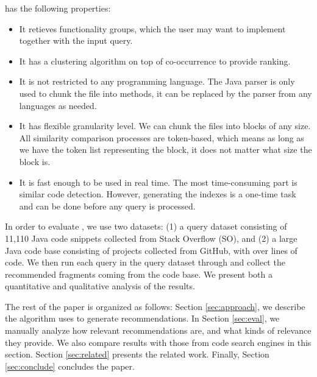 {\tool} has the following properties:
\begin{itemize}
	\item It retieves functionality groups, which the user may want to implement together with the input query.
	\item It has a clustering algorithm on top of co-occurrence to provide ranking.
	\item It is not restricted to any programming language. The Java parser is only used to chunk the file into methods, it can be replaced by the parser from any languages as needed.
	\item It has flexible granularity level. We can chunk the files into blocks of any size. All similarity comparison processes are token-based, which means as long as we have the token list representing the block, it does not matter what size the block is.
	\item It is fast enough to be used in real time. The most
          time-consuming part is similar code detection. However,
          generating the indexes is a one-time task and can be done
          before any query is processed.	
\end{itemize}

In order to evaluate {\tool}, we use two datasets: (1) a query dataset
consisting of 11,110 Java code snippets collected from Stack Overflow
(SO), and (2) a large Java code base consisting of  projects
collected from GitHub, with over  lines of code. We then run
each query in the query dataset through {\tool} and collect the
recommended fragments coming from the code base. We present both a
quantitative and qualitative analysis of the results.

The rest of the paper is organized as follows: Section
\ref{sec:approach}, we describe the algorithm {\tool} uses to generate
recommendations. In Section \ref{sec:eval}, we manually analyze how
relevant {\tool} recommendations are, and what kinds of relevance they
provide. We also compare {\tool} results with those from code search
engines in this section. Section \ref{sec:related} presents the
related work. Finally, Section \ref{sec:conclude} concludes the paper.
